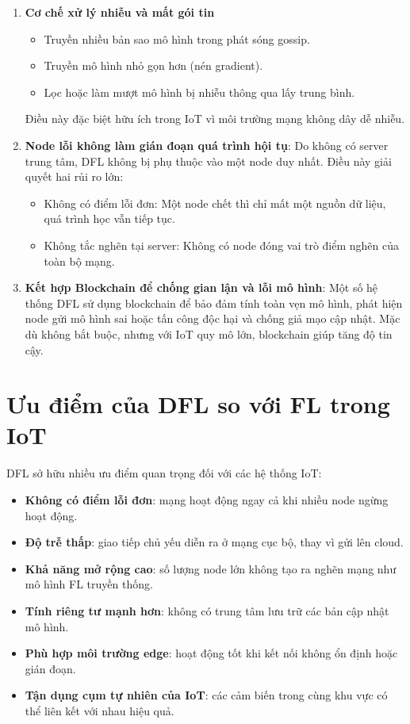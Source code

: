 \begin{enumerate}
\begin{itemize}
\end{itemize}
Điều này giúp mô hình hội tụ nhanh hơn và ổn định hơn so với FL tập trung.
    \item \textbf{Cơ chế xử lý nhiễu và mất gói tin}
    \begin{itemize}
    \item Truyền nhiều bản sao mô hình trong phát sóng gossip.
    \item Truyền mô hình nhỏ gọn hơn (nén gradient).
    \item Lọc hoặc làm mượt mô hình bị nhiễu thông qua lấy trung bình.
\end{itemize}
Điều này đặc biệt hữu ích trong IoT vì môi trường mạng không dây dễ nhiễu.
    \item \textbf{Node lỗi không làm gián đoạn quá trình hội tụ}: 
Do không có server trung tâm, DFL không bị phụ thuộc vào một node duy nhất.
Điều này giải quyết hai rủi ro lớn:
    \begin{itemize}
    \item Không có điểm lỗi đơn: Một node chết thì chỉ mất một nguồn dữ liệu, quá trình học vẫn tiếp tục.
    \item Không tắc nghẽn tại server: Không có node đóng vai trò điểm nghẽn của toàn bộ mạng.
\end{itemize}
    \item \textbf{Kết hợp Blockchain để chống gian lận và lỗi mô hình}: Một số hệ thống DFL sử dụng blockchain để bảo đảm tính toàn vẹn mô hình, phát hiện node gửi mô hình sai hoặc tấn công độc hại và chống giả mạo cập nhật. Mặc dù không bắt buộc, nhưng với IoT quy mô lớn, blockchain giúp tăng độ tin cậy.
\end{enumerate}


\section{Ưu điểm của DFL so với FL trong IoT}

\hspace{0.6cm}DFL sở hữu nhiều ưu điểm quan trọng đối với các hệ thống IoT:

\begin{itemize}
    \item \textbf{Không có điểm lỗi đơn}: mạng hoạt động ngay cả khi nhiều node ngừng hoạt động.
    \item \textbf{Độ trễ thấp}: giao tiếp chủ yếu diễn ra ở mạng cục bộ, thay vì gửi lên cloud.
    \item \textbf{Khả năng mở rộng cao}: số lượng node lớn không tạo ra nghẽn mạng như mô hình FL truyền thống.
    \item \textbf{Tính riêng tư mạnh hơn}: không có trung tâm lưu trữ các bản cập nhật mô hình.
    \item \textbf{Phù hợp môi trường edge}: hoạt động tốt khi kết nối không ổn định hoặc gián đoạn.
    \item \textbf{Tận dụng cụm tự nhiên của IoT}: các cảm biến trong cùng khu vực có thể liên kết với nhau hiệu quả.
\end{itemize}

